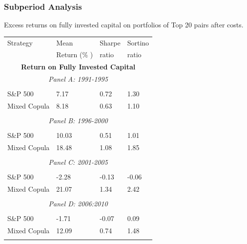 \documentclass[pdf,10pt,xcolor=dvipsnames,hide notes]{beamer}
\begin{document}
\begin{frame}

\frametitle{Subperiod Analysis}

\begin{threeparttable}[H]
\centering \tiny
\caption{Excess returns on fully invested capital on portfolios of Top 20 pairs after costs. }
\begin{tabularx}{\textwidth}{@{\extracolsep{\fill}}llll@{}}
	\toprule
	Strategy & Mean  & Sharpe & Sortino \\
	& Return (\% ) & ratio &  ratio     \\
	\midrule
	\multicolumn{4}{c}{\textbf{Return on Fully Invested Capital}} \\
	\multicolumn{4}{c}{\textit{Panel A: 1991-1995}} \\
	&       &       &       \\
	S\&P 500 & 7.17  & 0.72  & 1.30 \\
	Mixed Copula & 8.18  & 0.63  & 1.10 \\
	\multicolumn{1}{r}{} & \multicolumn{1}{r}{} & \multicolumn{1}{r}{} & \multicolumn{1}{r}{} \\
	\multicolumn{4}{c}{\textit{Panel B: 1996-2000}} \\
	&       &       &       \\
	S\&P 500 & 10.03  & 0.51  & 1.01 \\
	Mixed Copula & 18.48  & 1.08  & 1.85 \\
	\multicolumn{1}{r}{} & \multicolumn{1}{r}{} & \multicolumn{1}{r}{} & \multicolumn{1}{r}{} \\
	\multicolumn{4}{c}{\textit{Panel C: 2001-2005}} \\
	&       &       &       \\
	S\&P 500 & -2.28  & \cellcolor{Melon} -0.13  & -0.06 \\
	Mixed Copula & 21.07  & \cellcolor{corn} 1.34  & 2.42 \\
	\multicolumn{1}{r}{} & \multicolumn{1}{r}{} & \multicolumn{1}{r}{} & \multicolumn{1}{r}{} \\
	\multicolumn{4}{c}{\textit{Panel D: 2006:2010}} \\
	&       &       &       \\
	S\&P 500 & -1.71  & \cellcolor{Melon} -0.07  & 0.09 \\
	Mixed Copula & 12.09  & \cellcolor{corn} 0.74  & 1.48 \\
	\multicolumn{1}{r}{} & \multicolumn{1}{r}{} & \multicolumn{1}{r}{} & \multicolumn{1}{r}{} \\

\end{tabularx}
\end{threeparttable}
\end{frame}
\end{document}

